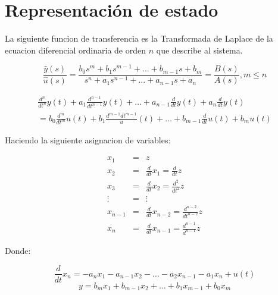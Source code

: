 
\chapter{Representación de estado}

    La siguiente funcion de transferencia es la Transformada de Laplace de la ecuacion diferencial ordinaria de orden $n$ que describe al sistema.

    \begin{equation}
        \frac{\hat{y}(s)}{\hat{u}(s)} = \frac{b_0 s^m + b_1 s^{m-1} + ... + b_{m-1} s + b_m}{s^n + a_1 s^{n-1} + ... + a_{n-1} s + a_n} = \frac{B(s)}{A(s)}, m \le n
    \end{equation}

    \begin{multline}
        \frac{d^n}{dt^n} y(t) + a_1 \frac{d^{n-1}}{dt^{n-1}} y(t) + \dots + a_{n-1} \frac{d}{dt} y(t) + a_n \frac{d}{dt} y(t) \\ = b_0 \frac{d^m}{dt^m} u(t) + b_1 \frac{d^{m-1}{dt^{m-1}}} u(t) + \dots + b_{m-1} \frac{d}{dt} u(t) + b_{m} u(t)
    \end{multline}

    Haciendo la siguiente asignacion de variables:

    \begin{eqnarray}
    x_1     & = & z \nonumber \\
    x_2     & = & \frac{d}{dt} x_1 = \frac{d}{dt} z \nonumber \\
    x_3     & = & \frac{d}{dt} x_2 = \frac{d^2}{dt^2} z \nonumber \\
    \vdots  & = & \vdots \nonumber \\
    x_{n-1} & = & \frac{d}{dt} x_{n-2} = \frac{d^{n-2}}{dt^{n-2}} z \nonumber \\
    x_n     & = & \frac{d}{dt} x_{n-1} = \frac{d^{n-1}}{d^{n-1}} z \nonumber
    \end{eqnarray}

    Donde:

    \begin{equation}
        \frac{d}{dt} x_n = -a_n x_1 - a_{n-1} x_2 - \dots - a_2 x_{n-1} - a_1 x_n + u(t)
    \end{equation}
    \begin{equation}
        y = b_m x_1 + b_{m-1} x_2 + \dots + b_1 x_{m-1} + b_0 x_m
    \end{equation}

